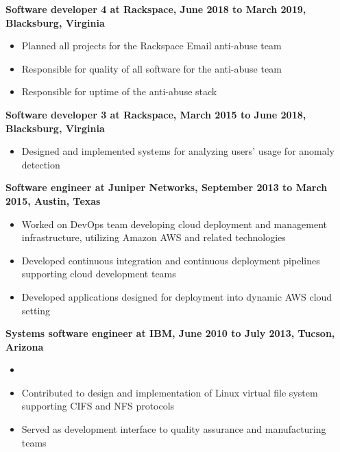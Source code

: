 \documentclass[10pt]{res}
\begin{document}
\begin{resume}
\begin{flushleft}
{\bf Software developer 4 at Rackspace, June 2018 to March 2019, Blacksburg, Virginia}
\end{flushleft}

\begin{itemize}
\setlength{\itemsep}{1pt}
\setlength{\parskip}{0pt}
\setlength{\parsep}{0pt}
\item Planned all projects for the Rackspace Email anti-abuse team
\item Responsible for quality of all software for the anti-abuse team
\item Responsible for uptime of the anti-abuse stack
\end{itemize}

\begin{flushleft}
{\bf Software developer 3 at Rackspace, March 2015 to June 2018, Blacksburg, Virginia}
\end{flushleft}

\begin{itemize}
\setlength{\itemsep}{1pt}
\setlength{\parskip}{0pt}
\setlength{\parsep}{0pt}
\item Designed and implemented systems for analyzing users' usage for anomaly detection
\end{itemize}

\begin{flushleft}
{\bf Software engineer at Juniper Networks, September 2013 to March 2015, Austin, Texas}
\end{flushleft}

\begin{itemize}
\setlength{\itemsep}{1pt}
\setlength{\parskip}{0pt}
\setlength{\parsep}{0pt}
\item Worked on DevOps team developing cloud deployment and management infrastructure, utilizing Amazon AWS and related technologies
\item Developed continuous integration and continuous deployment pipelines supporting cloud development teams
\item Developed applications designed for deployment into dynamic AWS cloud setting
\end{itemize}

\begin{flushleft}
{\bf Systems software engineer at IBM, June 2010 to July 2013, Tucson, Arizona}
\end{flushleft}

\begin{itemize}
\setlength{\itemsep}{1pt}
\setlength{\parskip}{0pt}
\setlength{\parsep}{0pt}
\item
\item Contributed to design and implementation of Linux virtual file system supporting CIFS and NFS protocols
\item Served as development interface to quality assurance and manufacturing teams
\end{itemize}


\end{resume}
\end{document}
